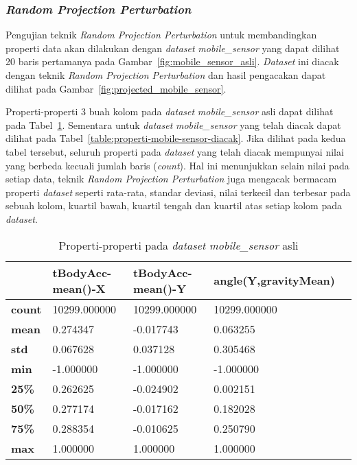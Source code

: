 \subsubsection{\textit{Random Projection Perturbation}}
\label{subsubsec:pengujian-properti-rpp}

Pengujian teknik \textit{Random Projection Perturbation} untuk membandingkan properti data akan dilakukan dengan \textit{dataset} \textit{mobile\_sensor} yang dapat dilihat 20 baris pertamanya pada Gambar~\ref{fig:mobile_sensor_asli}. \textit{Dataset} ini diacak dengan teknik \textit{Random Projection Perturbation} dan hasil pengacakan dapat dilihat pada Gambar~\ref{fig:projected_mobile_sensor}.

Properti-properti 3 buah kolom pada \textit{dataset} \textit{mobile\_sensor} asli dapat dilihat pada Tabel~\ref{table:properti-mobile-sensor-asli}. Sementara untuk \textit{dataset} \textit{mobile\_sensor} yang telah diacak dapat dilihat pada Tabel~\ref{table:properti-mobile-sensor-diacak}. Jika dilihat pada kedua tabel tersebut, seluruh properti pada \textit{dataset} yang telah diacak mempunyai nilai yang berbeda kecuali jumlah baris (\textit{count}). Hal ini menunjukkan selain nilai pada setiap data, teknik \textit{Random Projection Perturbation} juga mengacak bermacam properti \textit{dataset} seperti rata-rata, standar deviasi, nilai terkecil dan terbesar pada sebuah kolom, kuartil bawah, kuartil tengah dan kuartil atas setiap kolom pada \textit{dataset}.

\begin{table}
	\centering
	\caption{Properti-properti pada \textit{dataset} \textit{mobile\_sensor} asli}
	\begin{tabular}{l|llll}
		\hline
			&\textbf{tBodyAcc-mean()-X}&\textbf{tBodyAcc-mean()-Y}&\textbf{angle(Y,gravityMean)}\\ \hline
		\textbf{count}&10299.000000&10299.000000&10299.000000\\
		\textbf{mean}&0.274347&-0.017743&0.063255\\
		\textbf{std}&0.067628&0.037128&0.305468\\
		\textbf{min}&-1.000000&-1.000000&-1.000000\\
		\textbf{25\%}&0.262625&-0.024902&0.002151\\
		\textbf{50\%}&0.277174&-0.017162&0.182028\\
		\textbf{75\%}&0.288354&-0.010625&0.250790\\
		\textbf{max}&1.000000&1.000000&1.000000\\
		\hline
	\end{tabular}
	\label{table:properti-mobile-sensor-asli}
\end{table}

